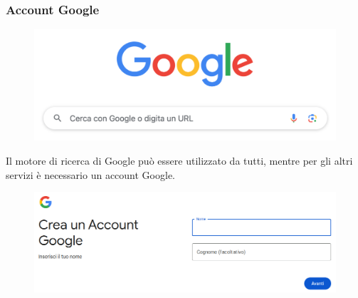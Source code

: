 \documentclass[]{beamer}
\begin{document}
\begin{frame}
\frametitle{Account Google}
\begin{figure}
  \includegraphics[width=.5\columnwidth]{img/googlesearch.png}
\end{figure}
Il \alert{motore di ricerca} di Google può essere utilizzato da tutti, mentre per gli altri servizi è necessario un \alert{account Google}.

\begin{figure}
  \includegraphics[width=.8\columnwidth]{img/accountgoogle.png}
\end{figure}
\end{frame}
\end{document}
